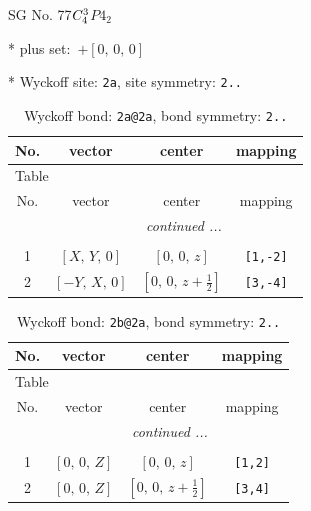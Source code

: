 \documentclass[fleqn,8pt]{jsarticle}
\begin{document}
\setcounter{MaxMatrixCols}{32}

\renewcommand{\tablename}{Table~}
\renewcommand{\figurename}{Figure~}
\begin{center}
\LARGE
SG No. 77\quad$C_{\rm 4}^{3}$\quad$P4_2$\quad[ tetragonal ]
\end{center}

* plus set:\,\,\,$+\left[ 0,\, 0,\, 0 \right]$


* Wyckoff site: {\tt 2a}, site symmetry: {\tt 2..}
\renewcommand{\arraystretch}{1.2}
\begin{longtable}{cccc}
\caption{Wyckoff bond: {\tt 2a@2a}, bond symmetry: {\tt 2..}}
 \\
 \hline \hline
No. & vector & center & mapping \\ \hline \endfirsthead

\multicolumn{3}{l}{\tablename\ \thetable{}} \\
 \hline \hline
No. & vector & center & mapping \\ \hline \endhead

 \hline \hline
\multicolumn{3}{r}{\footnotesize\it continued ...} \\ \endfoot

 \hline \hline
\multicolumn{3}{r}{} \\ \endlastfoot

1 & $\left[ X,\, Y,\, 0 \right]$ & $\left[ 0,\, 0,\, z \right]$ & {\tt [1,-2]} \\ \hline
2 & $\left[ - Y,\, X,\, 0 \right]$ & $\left[ 0,\, 0,\, z + \frac{1}{2} \right]$ & {\tt [3,-4]} \\
\end{longtable}
\renewcommand{\arraystretch}{1.2}
\begin{longtable}{cccc}
\caption{Wyckoff bond: {\tt 2b@2a}, bond symmetry: {\tt 2..}}
 \\
 \hline \hline
No. & vector & center & mapping \\ \hline \endfirsthead

\multicolumn{3}{l}{\tablename\ \thetable{}} \\
 \hline \hline
No. & vector & center & mapping \\ \hline \endhead

 \hline \hline
\multicolumn{3}{r}{\footnotesize\it continued ...} \\ \endfoot

 \hline \hline
\multicolumn{3}{r}{} \\ \endlastfoot

1 & $\left[ 0,\, 0,\, Z \right]$ & $\left[ 0,\, 0,\, z \right]$ & {\tt [1,2]} \\ \hline
2 & $\left[ 0,\, 0,\, Z \right]$ & $\left[ 0,\, 0,\, z + \frac{1}{2} \right]$ & {\tt [3,4]} \\
\end{longtable}
\end{document}
